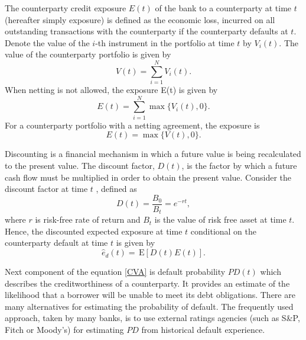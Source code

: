 \documentclass{amsart}
\theoremstyle{definition}\newtheorem{definition}[theorem]{Definition}
\theoremstyle{remark}\newtheorem{remark}[theorem]{Remark}
\newcommand{\E}{\,\mathrm{E}}
\begin{document}
The counterparty credit exposure $E(t)$ of the bank to a counterparty at time $t$ (hereafter simply exposure) is defined as the economic loss, incurred on all outstanding transactions with the counterparty if the counterparty defaults at $t$.
Denote the value of the $i$-th instrument in the portfolio at time $t$ by  $V_i(t)$. 
The value of the counterparty portfolio is given by 
\begin{equation}
V(t)=\sum_{i=1}^N V_i(t).
\end{equation}
When netting is not allowed, the exposure E(t) is given by
\begin{equation}
E(t)=\sum_{i=1}^N\max\{V_i(t),0\}.
\end{equation}
For a counterparty portfolio with a netting agreement, the exposure is
\begin{equation}
E(t)=\max\{V(t),0\}.
\end{equation}

Discounting is a financial mechanism in which a future value is being recalculated to the present value.
The discount factor, $D(t)$, is the factor by which a future cash flow must be multiplied in order to obtain the present value.
Consider the discount factor at time $t$%
, defined as 
\begin{equation}
D(t)=\frac{B_0}{B_t}=e^{-rt},
\end{equation}
where $r$ is risk-free rate of return and $B_t$ is the value of risk free asset at time $t$. 
Hence, the discounted expected exposure at time $t$ conditional on the counterparty default at time $t$ is given by 
\begin{equation}
\hat{e}_d(t)=\E[D(t) E(t)].
\end{equation}

Next component of the equation \eqref{CVA} is default probability $PD(t)$ which describes the creditworthiness of a counterparty. 
It provides an estimate of the likelihood that a borrower will be unable to meet its debt obligations.
There are many alternatives for estimating the probability of default.
The frequently used approach, taken by many banks, is to use external ratings agencies (such as S\&P, Fitch or Moody's) for estimating $PD$ from historical default experience.

\begin{table}
\caption{Resulting CVA}
\end{table}
\end{document}
